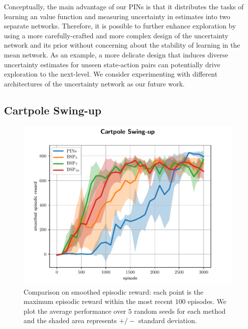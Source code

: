 \documentclass[letterpaper]{article} %
\theoremstyle{definition}
\begin{document}
Conceptually, the main advantage of our PINs is that it distributes the tasks of learning an value function and measuring uncertainty in estimates into two separate networks. Therefore, it is possible to further enhance exploration by using a more carefully-crafted and more complex design of the uncertainty network and its prior without concerning about the stability of learning in the mean network. As an example, a more delicate design that induces diverse uncertainty estimates for unseen state-action pairs can potentially drive exploration to the next-level. We consider experimenting with different architectures of the uncertainty network as our future work.

\vspace{-1.58mm}
\subsection{Cartpole Swing-up}
\vspace{-1.91mm}
\vspace{-3.81mm}
\begin{figure}[ht]
\centering
\includegraphics[width=1.0\linewidth]{cartpole_std_plot.pdf}
\caption{Comparison on smoothed episodic reward: each point is the maximum episodic reward within the most recent $100$ episodes. We plot the average performance over $5$ random seeds for each method and the shaded area represents $+/-$ standard deviation.}
\label{fig:cartpole_per}
\end{figure}
\end{document}
